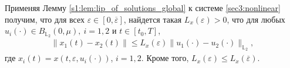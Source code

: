 \documentclass[../main.tex]{subfiles}
\begin{document}
Применяя Лемму \ref{s1:lem:lip_of_solutions_global} к системе \eqref{sec3:nonlinear} получим, что для всех $\varepsilon\in [0,\overline{\varepsilon}]$, найдется такая $L_x(\varepsilon) > 0$, что для любых $u_i(\cdot) \in B_{\mathbb{L}_2}(0,\mu), \ i = 1,2$ и $t \in [t_0,T]$, 
\begin{gather*}
	\| x_1(t) - x_2(t) \| \leqslant L_x(\varepsilon) \| u_1(\cdot) - u_2(\cdot) \|_{\mathbb{L}_2},
\end{gather*}
где $x_i(t) = x(t,\varepsilon,u_i(\cdot))$, $i = 1,2$. 
Кроме того, $L_x(\varepsilon) \leqslant L_x(\overline{\varepsilon})$. 
\end{document}
